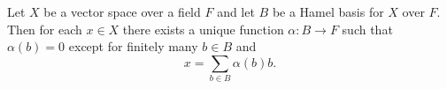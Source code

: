 Let \(X\) be a vector space over a field \(F\) and let \(B\) be a Hamel basis for \(X\) over \(F\). Then for each \(x \in X\) there exists a unique function \(\alpha : B \to F\) such that \(\alpha(b) = 0\) except for finitely many \(b \in B\) and
\[
x = \sum_{b \in B} \alpha(b) b.
\]
